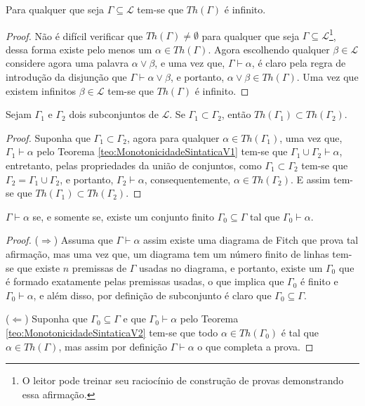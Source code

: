 \begin{teorema}
  Para qualquer que seja $\Gamma \subseteq \mathcal{L}$ tem-se que $Th(\Gamma)$ é infinito.
\end{teorema}

\begin{proof}
  Não é difícil verificar que $Th(\Gamma) \neq \emptyset$ para qualquer que seja $\Gamma \subseteq \mathcal{L}$\footnote{O leitor pode treinar seu raciocínio de construção de provas demonstrando essa afirmação.}, dessa forma existe pelo menos um $\alpha \in Th(\Gamma)$. Agora escolhendo qualquer $\beta \in \mathcal{L}$ considere agora uma palavra $\alpha \lor \beta$, e uma vez que, $\Gamma \vdash \alpha$, é claro pela regra de introdução da disjunção que $\Gamma \vdash \alpha \lor \beta$, e portanto, $\alpha \lor \beta \in Th(\Gamma)$. Uma vez que existem infinitos $\beta \in \mathcal{L}$ tem-se que $Th(\Gamma)$ é infinito.
\end{proof}

\begin{teorema}\label{teo:MonotonicidadeSintaticaV2}
  Sejam $\Gamma_1$ e $\Gamma_2$ dois subconjuntos de $\mathcal{L}$. Se $\Gamma_1 \subset \Gamma_2$, então $Th(\Gamma_1) \subset Th(\Gamma_2)$.
\end{teorema}

\begin{proof}
  Suponha que $\Gamma_1 \subset \Gamma_2$, agora para qualquer $\alpha \in Th(\Gamma_1)$, uma vez que, $\Gamma_1 \vdash \alpha$ pelo Teorema \ref{teo:MonotonicidadeSintaticaV1} tem-se que $\Gamma_1 \cup \Gamma_2 \vdash \alpha$, entretanto, pelas propriedades da união de conjuntos, como $\Gamma_1 \subset \Gamma_2$ tem-se que $\Gamma_2 = \Gamma_1 \cup \Gamma_2$, e portanto, $\Gamma_2 \vdash \alpha$, consequentemente, $\alpha \in Th(\Gamma_2)$. E assim tem-se que $Th(\Gamma_1) \subset Th(\Gamma_2)$.
\end{proof}

\begin{teorema}\label{teo:TeoremaDaCompacidade}
  $\Gamma \vdash \alpha$ se, e somente se, existe um conjunto finito $\Gamma_0 \subseteq \Gamma$ tal que $\Gamma_0 \vdash \alpha$.
\end{teorema}

\begin{proof}
  ($\Rightarrow$) Assuma que $\Gamma \vdash \alpha$ assim existe uma diagrama de Fitch que prova tal afirmação, mas uma vez que, um diagrama tem um número finito de linhas tem-se que existe $n$ premissas de $\Gamma$ usadas no diagrama, e portanto, existe um $\Gamma_0$ que é formado exatamente pelas premissas usadas, o que implica que $\Gamma_0$ é finito e $\Gamma_0 \vdash \alpha$, e além disso, por definição de subconjunto é claro que $\Gamma_0 \subseteq \Gamma$.
  
  ($\Leftarrow$) Suponha que $\Gamma_0 \subseteq \Gamma$ e que $\Gamma_0 \vdash \alpha$ pelo Teorema \ref{teo:MonotonicidadeSintaticaV2} tem-se que todo $\alpha \in Th(\Gamma_0)$ é tal que $\alpha \in Th(\Gamma)$, mas assim por definição $\Gamma \vdash \alpha$ o que completa a prova.
\end{proof}

